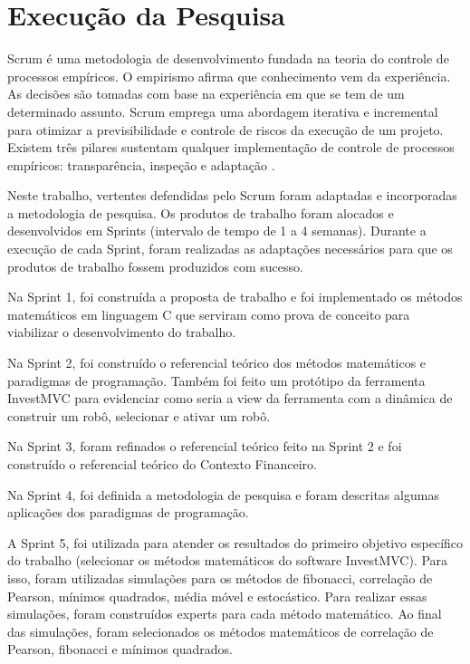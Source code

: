 \section{Execução da Pesquisa}

Scrum é uma metodologia de desenvolvimento fundada na teoria do controle de processos empíricos. O empirismo afirma que conhecimento vem da experiência. As decisões são tomadas com base na experiência em que se tem de um determinado assunto. Scrum emprega uma abordagem iterativa e incremental para otimizar a previsibilidade e controle de riscos da execução de um projeto. Existem três pilares sustentam qualquer implementação de controle de processos empíricos: transparência, inspeção e adaptação \cite[pág.~4]{schwaber2013}.

Neste trabalho, vertentes defendidas pelo Scrum foram adaptadas e incorporadas a metodologia de pesquisa. Os produtos de  trabalho foram alocados e desenvolvidos em Sprints (intervalo de tempo de 1 a 4 semanas). Durante a execução de cada Sprint, foram realizadas as adaptações necessários para que os produtos de trabalho fossem produzidos com sucesso.

Na Sprint 1, foi construída a proposta de trabalho e foi implementado os métodos matemáticos em linguagem C que serviram como prova de conceito para viabilizar o desenvolvimento do trabalho.

Na Sprint 2, foi construído o referencial teórico dos métodos matemáticos e paradigmas de programação. Também foi feito um protótipo da ferramenta InvestMVC para evidenciar como seria a view da ferramenta com a dinâmica de construir um robô, selecionar e ativar um robô.

Na Sprint 3, foram refinados o referencial teórico feito na Sprint 2 e foi construído o referencial teórico do Contexto Financeiro.

Na Sprint 4, foi definida a metodologia de pesquisa e foram descritas algumas aplicações dos paradigmas de programação.

A Sprint 5, foi utilizada para atender os resultados do primeiro objetivo específico do trabalho (selecionar os métodos matemáticos do software InvestMVC). Para isso, foram utilizadas simulações para os métodos de fibonacci, correlação de Pearson, mínimos quadrados, média móvel e estocástico. Para realizar essas simulações, foram construídos experts para cada método matemático. Ao final das simulações, foram selecionados os métodos matemáticos de correlação de Pearson, fibonacci e mínimos quadrados.

